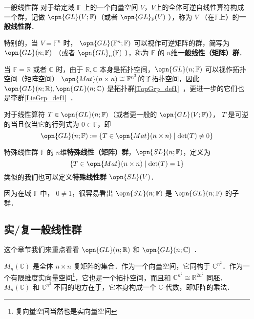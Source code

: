 
\begin{issues}
\issueDraft
\end{issues}


\begin{definition}{一般线性群}\label{GL_def1}
对于给定域 $\mathbb{F}$ 上的一个向量空间 $V$，$V$上的全体可逆自线性算符构成一个群，记做 $\opn{GL}(V; \mathbb{F})$（或者 $\opn{GL}_{\mathbb{F}}(V)$ ），称为 $V$ （在$\mathbb{F}$上）的\textbf{一般线性群}．

特别的，当 $V = \mathbb{F}^n$ 时， $\opn{GL}(\mathbb{F}^n; \mathbb{F})$ 可以视作可逆矩阵的群，简写为 $\opn{GL}(n; \mathbb{F})$ （或者 $\opn{GL}_n(\mathbb{F})$ ），称为 $\mathbb{F}$ 的 $n$维\textbf{一般线性（矩阵）群}．

当 $\mathbb{F} = \mathbb{R}$ 或者 $\mathbb{C}$ 时，由于 $\mathbb{R}, \mathbb{C}$ 本身是拓扑空间，$\opn{GL}(n; \mathbb{F})$ 可以视作拓扑空间（矩阵空间） $\opn{Mat}(n \times n) \cong \mathbb{F}^{n^2}$的子拓扑空间，因此 $\opn{GL}(n; \mathbb{R}), \opn{GL}(n; \mathbb{C})$ 是拓扑群\autoref{TopGrp_def1}~，更进一步的它们也是李群\autoref{LieGrp_def1}~．
\end{definition}

对于线性算符 $T \in \opn{GL}(n; \mathbb{F})$（或者更一般的 $\opn{GL}(V; \mathbb{F})$）， $T$ 是可逆的当且仅当它的行列式为 $0 \in \mathbb{F}$，即
$$
\opn{GL}(n; \mathbb{F}): = \{T \in \opn{Mat}(n \times n) \mid \det(T) \neq 0\}
$$

\begin{definition}{特殊线性群}
$\mathbb{F}$ 的 $n$维\textbf{特殊线性（矩阵）群}，$\opn{SL}(n; \mathbb{F})$，定义为
$$
\{T \in \opn{Mat}(n \times n) \mid \det(T) = 1\}
$$
类似的我们也可以定义\textbf{特殊线性群} $\opn{SL}(V)$．
\end{definition}

因为在域 $\mathbb{F}$ 中， $0 \neq 1$，很容易看出 $\opn{SL}(n; \mathbb{F})$ 是 $\opn{GL}(n; \mathbb{F})$ 的子群．

\subsection{实/复一般线性群}

这个章节我们来重点看看 $\opn{GL}(n; \mathbb{R})$ 和 $\opn{GL}(n; \mathbb{C})$ ．

$M_n(\mathbb{C})$ 是全体 $n \times n$ 复矩阵的集合．作为一个向量空间，它同构于 $\mathbb{C}^{n^2}$．作为一个有限维度实向量空间\footnote{复向量空间当然也是实向量空间}，它也是一个拓扑空间，而且和 $\mathbb{C}^{n^2} \cong \mathbb{R}^{2 n^2}$ 同胚．$M_n(\mathbb{C})$ 和 $\mathbb{C}^{n^2}$ 不同的地方在于，它本身构成一个 $\mathbb{C}$-代数，即矩阵的乘法．

